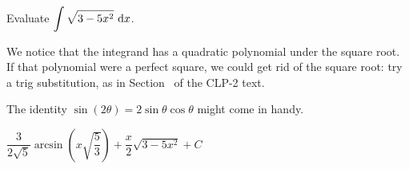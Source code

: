 \begin{question} Evaluate
$\displaystyle\int \sqrt{3-5x^2}~\mathrm{d}x$.
\end{question}

\begin{hint}
We notice that the integrand has a quadratic polynomial under the square root. If that polynomial were a perfect square, we could get rid of the square root:
try a trig substitution, as in Section~ of the CLP-2 text.

The identity $\sin(2\theta)=2\sin\theta\cos\theta$ might come in handy.
\end{hint}

\begin{answer}
$\dfrac{3}{2\sqrt{5}}
\arcsin\left(x\sqrt{\dfrac{5}{3}}\right) + \dfrac{x}{2}\sqrt{3-5x^2}
+C$
\end{answer}

